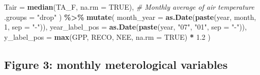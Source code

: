\documentclass[
]{article}
\newenvironment{Shaded}{\begin{snugshade}}{\end{snugshade}}
\newcommand{\AttributeTok}[1]{\textcolor[rgb]{0.13,0.29,0.53}{#1}}
\newcommand{\CommentTok}[1]{\textcolor[rgb]{0.56,0.35,0.01}{\textit{#1}}}
\newcommand{\ConstantTok}[1]{\textcolor[rgb]{0.56,0.35,0.01}{#1}}
\newcommand{\DecValTok}[1]{\textcolor[rgb]{0.00,0.00,0.81}{#1}}
\newcommand{\FloatTok}[1]{\textcolor[rgb]{0.00,0.00,0.81}{#1}}
\newcommand{\FunctionTok}[1]{\textcolor[rgb]{0.13,0.29,0.53}{\textbf{#1}}}
\newcommand{\NormalTok}[1]{#1}
\newcommand{\SpecialCharTok}[1]{\textcolor[rgb]{0.81,0.36,0.00}{\textbf{#1}}}
\newcommand{\StringTok}[1]{\textcolor[rgb]{0.31,0.60,0.02}{#1}}
\begin{document}
\begin{Shaded}
\begin{Highlighting}[]
    \AttributeTok{Tair =} \FunctionTok{median}\NormalTok{(TA\_F, }\AttributeTok{na.rm =} \ConstantTok{TRUE}\NormalTok{),  }\CommentTok{\# Monthly average of air temperature}
    \AttributeTok{.groups =} \StringTok{"drop"}
\NormalTok{  ) }\SpecialCharTok{\%\textgreater{}\%}
  \FunctionTok{mutate}\NormalTok{(}
    \AttributeTok{month\_year =} \FunctionTok{as.Date}\NormalTok{(}\FunctionTok{paste}\NormalTok{(year, month, }\DecValTok{1}\NormalTok{, }\AttributeTok{sep =} \StringTok{"{-}"}\NormalTok{)),}
    \AttributeTok{year\_label\_pos =} \FunctionTok{as.Date}\NormalTok{(}\FunctionTok{paste}\NormalTok{(year, }\StringTok{"07"}\NormalTok{, }\StringTok{"01"}\NormalTok{, }\AttributeTok{sep =} \StringTok{"{-}"}\NormalTok{)),}
    \AttributeTok{y\_label\_pos =} \FunctionTok{max}\NormalTok{(GPP, RECO, NEE, }\AttributeTok{na.rm =} \ConstantTok{TRUE}\NormalTok{) }\SpecialCharTok{*} \FloatTok{1.2}
\NormalTok{  ) }
\end{Highlighting}
\end{Shaded}

\subsection{Figure 3: monthly meterological
variables}\label{figure-3-monthly-meterological-variables}
\end{document}
